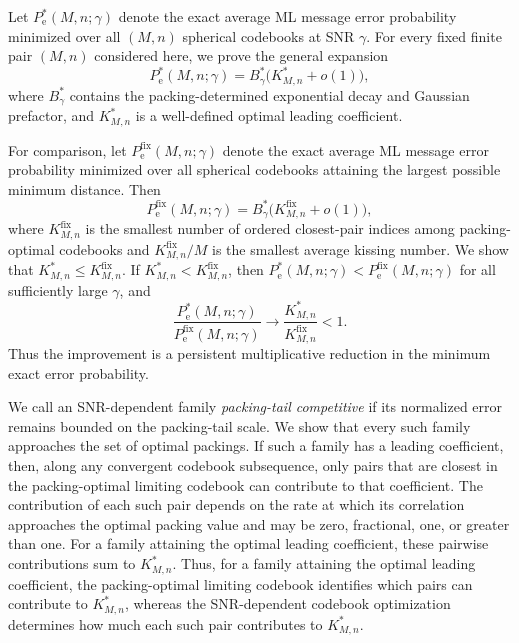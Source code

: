 \documentclass[12pt,draftclsnofoot,onecolumn]{IEEEtran}
\newcommand{\Pe}{P_{\mathrm e}}
\theoremstyle{definition}
\begin{document}
Let \(\Pe^{\ast}(M,n;\gamma)\) denote the exact
average ML message error probability minimized over all \((M,n)\) spherical
codebooks at SNR
\(\gamma\).  For every fixed finite pair \((M,n)\) considered
here, we prove the general expansion
\begin{equation*}
  \Pe^{\ast}(M,n;\gamma)
  =B_\gamma^{\ast}\bigl(K^{\ast}_{M,n}+o(1)\bigr),
\end{equation*}
where \(B_\gamma^{\ast}\) contains the packing-determined exponential
decay and Gaussian prefactor, and \(K^{\ast}_{M,n}\) is a well-defined
optimal leading coefficient.

For comparison, let \(\Pe^{\mathrm{fix}}(M,n;\gamma)\) denote the exact
average ML message error probability minimized over all spherical
codebooks attaining the largest possible minimum distance.  Then
\begin{equation*}
  \Pe^{\mathrm{fix}}(M,n;\gamma)
  =B_\gamma^{\ast}\bigl(K^{\mathrm{fix}}_{M,n}+o(1)\bigr),
\end{equation*}
where \(K^{\mathrm{fix}}_{M,n}\) is the smallest number of ordered
closest-pair indices among packing-optimal codebooks and \(K^{\mathrm{fix}}_{M,n}/M\) is the
smallest average kissing number.  We show that
\(K^{\ast}_{M,n}\leq K^{\mathrm{fix}}_{M,n}\).  If
\(K^{\ast}_{M,n}<K^{\mathrm{fix}}_{M,n}\), then
\(\Pe^{\ast}(M,n;\gamma)<\Pe^{\mathrm{fix}}(M,n;\gamma)\) for all
sufficiently large \(\gamma\), and
\begin{equation*}
  \frac{\Pe^{\ast}(M,n;\gamma)}
       {\Pe^{\mathrm{fix}}(M,n;\gamma)}
  \longrightarrow
  \frac{K^{\ast}_{M,n}}{K^{\mathrm{fix}}_{M,n}}<1.
\end{equation*}
Thus the improvement is a persistent multiplicative reduction in the
minimum exact error probability.

We call an SNR-dependent family \emph{packing-tail competitive} if its
normalized error remains bounded on the packing-tail scale.  We show that
every such family approaches the set of optimal packings.  If such a family
has a leading coefficient, then, along any convergent
codebook subsequence, only pairs that are closest in the packing-optimal
limiting codebook can contribute to that coefficient.  The contribution of
each such pair depends on the rate at which its correlation approaches the
optimal packing value and may be zero, fractional, one, or greater than one.
For a family attaining the optimal
leading coefficient, these pairwise contributions sum to
\(K^{\ast}_{M,n}\).  Thus, for a family attaining the optimal leading
coefficient, the packing-optimal limiting
codebook identifies which pairs can contribute to \(K^{\ast}_{M,n}\),
whereas the SNR-dependent codebook optimization determines how much each
such pair contributes to \(K^{\ast}_{M,n}\).
  
\end{document}

